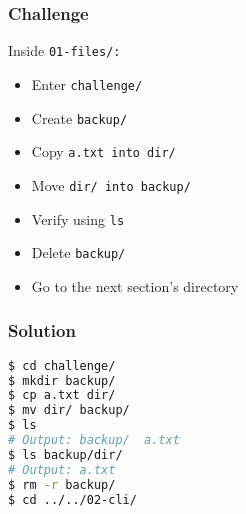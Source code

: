 \begin{frame}
\frametitle{Challenge}
Inside \tt{01-files/}:
\begin{itemize}
    \item Enter \tt{challenge/}
    \item Create \tt{backup/}
    \item Copy \tt{a.txt} into \tt{dir/}
    \item Move \tt{dir/} into \tt{backup/}
    \item Verify using \tt{ls}
    \item Delete \tt{backup/}
    \item Go to the next section's directory
\end{itemize}
\end{frame}

\begin{frame}[fragile]
\frametitle{Solution}
\begin{lstlisting}[language=bash]
$ cd challenge/
$ mkdir backup/
$ cp a.txt dir/
$ mv dir/ backup/
$ ls
# Output: backup/  a.txt
$ ls backup/dir/
# Output: a.txt
$ rm -r backup/
$ cd ../../02-cli/
\end{lstlisting}
\end{frame}
